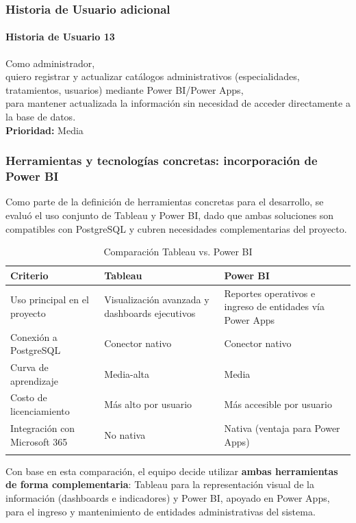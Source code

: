 \documentclass[12pt,letterpaper]{article}
\begin{document}
\subsubsection*{Historia de Usuario adicional}

\paragraph{Historia de Usuario 13}
Como administrador,\\
quiero registrar y actualizar catálogos administrativos (especialidades, tratamientos, usuarios) mediante Power BI/Power Apps,\\
para mantener actualizada la información sin necesidad de acceder directamente a la base de datos.\\
\textbf{Prioridad:} Media

\subsubsection*{Herramientas y tecnologías concretas: incorporación de Power BI}

Como parte de la definición de herramientas concretas para el desarrollo, se evaluó el uso
conjunto de Tableau y Power BI, dado que ambas soluciones son compatibles con
PostgreSQL y cubren necesidades complementarias del proyecto.

\begin{xltabular}{\textwidth}{|p{2.6cm}|X|X|}
\hline
{}
\textbf{Criterio} & \textbf{Tableau} & \textbf{Power BI} \\
\hline
\endhead
Uso principal en el proyecto & Visualización avanzada y dashboards ejecutivos & Reportes operativos e ingreso de entidades vía Power Apps \\
\hline
Conexión a PostgreSQL & Conector nativo & Conector nativo \\
\hline
Curva de aprendizaje & Media-alta & Media \\
\hline
Costo de licenciamiento & Más alto por usuario & Más accesible por usuario \\
\hline
Integración con Microsoft 365 & No nativa & Nativa (ventaja para Power Apps) \\
\hline
\caption{Comparación Tableau vs. Power BI}
\end{xltabular}

Con base en esta comparación, el equipo decide utilizar \textbf{ambas herramientas de
forma complementaria}: Tableau para la representación visual de la información
(dashboards e indicadores) y Power BI, apoyado en Power Apps, para el ingreso y
mantenimiento de entidades administrativas del sistema.
\end{document}
